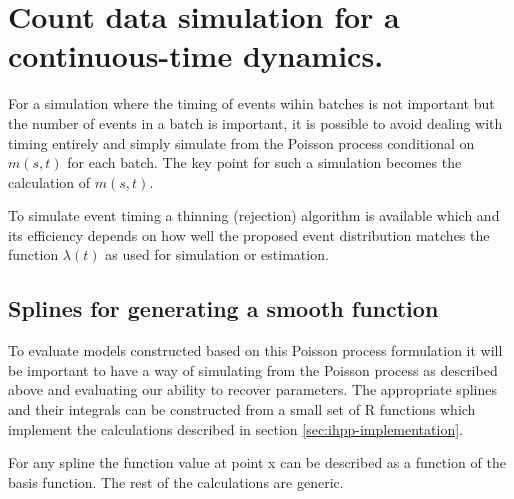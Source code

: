 
\chapter{Count data simulation for a continuous-time dynamics.}

For a simulation where the timing of events wihin batches is not
important but the number of events in a batch is important, it is
possible to avoid dealing with timing entirely and simply simulate
from the Poisson process conditional on $m(s,t)$ for each batch.
The key point for such a simulation becomes the calculation of $m(s,t)$.

To simulate event timing a thinning (rejection) algorithm is available which and
its efficiency depends on how well the proposed event distribution
matches the function $\lambda(t)$ as used for simulation or estimation.

\section{Splines for generating a smooth function}

To evaluate models constructed based on this Poisson process formulation
it will be important to have a way of simulating from the Poisson
process as described above and evaluating our ability to recover
parameters.  The appropriate splines and their integrals can be
constructed from a small set of R functions which implement the
calculations described in section \ref{sec:ihpp-implementation}.

\begin{knitrout}
\color{fgcolor}\begin{kframe}
\begin{alltt}
\hlstd{(}\hlstd{)}
\end{alltt}
\end{kframe}
\end{knitrout}

For any spline the function value at point x can be described as a
function of the basis function.  The rest of the calculations are
generic.

